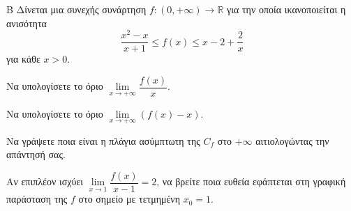 \begin{thema}{Β}
Δίνεται μια συνεχής συνάρτηση $f: (0, +\infty) \to \mathbb{R}$ για την οποία ικανοποιείται η ανισότητα \[\dfrac{x^2 - x}{x+1} \le f(x) \le x - 2 + \dfrac{2}{x}\] για κάθε $x > 0$.
\begin{erwthma}
  \item Να υπολογίσετε το όριο $\lim\limits_{x \to +\infty} \dfrac{f(x)}{x}$.
  \item Να υπολογίσετε το όριο $\lim\limits_{x \to +\infty} (f(x) - x)$.
  \item Να γράψετε ποια είναι η πλάγια ασύμπτωτη της $C_f$ στο $+\infty$ αιτιολογώντας την απάντησή σας.
  \item Αν επιπλέον ισχύει $\lim\limits_{x \to 1} \dfrac{f(x)}{x-1} = 2$, να βρείτε ποια ευθεία εφάπτεται στη γραφική παράσταση της $f$ στο σημείο με τετμημένη $x_0=1$.
\end{erwthma}
\end{thema}
